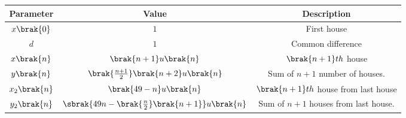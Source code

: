 \footnotesize
\begin{tabular}{|c|c|c|}
\hline
Parameter & Value & Description \\
\hline
$x\brak{0}$ & $1$ & First house \\
\hline
$d$ & $1$ & Common difference\\
\hline
$x\brak{n}$ & $\brak{n+1}u\brak{n}$ & $\brak{n+1}th$ house\\
\hline
$y\brak{n}$ & $\brak{\frac{n+1}{2}}\brak{n+2}u\brak{n}$ & Sum of $n+1$ number of houses.\\
\hline
$x_2\brak{n}$ & $\brak{49-n}u\brak{n}$ & $\brak{n+1}th$ house from last house\\
\hline
$y_2\brak{n}$ & $\sbrak{49n-\brak{\frac{n}{2}}\brak{n+1}}u\brak{n}$ & Sum of $n+1$ houses from last house.\\
\hline
\end{tabular}